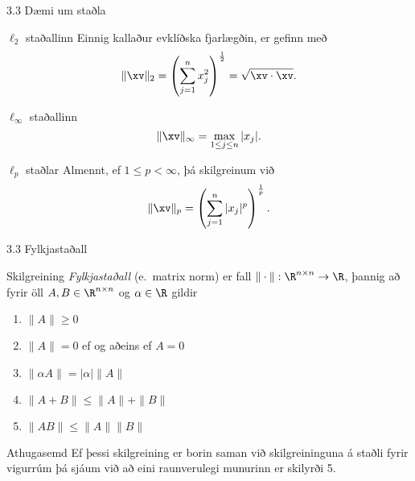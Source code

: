 \begin{frame}{3.3 Dæmi um staðla}
\begin{block}{$\ell_2$ staðallinn}
 Einnig kallaður evklíðska fjarlægðin, er gefinn með 
$$
\|\xv\|_2 = \left( \sum_{j=1}^n x_j^2 \right)^{\frac 12} = \sqrt{\xv \cdot \xv}.
$$
\end{block}
\vspace{-0.5cm}
\pause

\begin{block}{$\ell_\infty$ staðallinn}
$$
  \|\xv\|_\infty = \max_{1\leq j \leq n} |x_j|.
$$
\end{block}
\vspace{-0.5cm}
\pause

\begin{block}{$\ell_p$ staðlar}
 Almennt, ef $1\leq p < \infty$, þá skilgreinum við 
$$
\|\xv\|_p = \left( \sum_{j=1}^n |x_j|^p \right)^{\frac 1p}.
$$
\end{block}

\end{frame}

\begin{frame}{3.3 Fylkjastaðall}
 \begin{block}{Skilgreining}
  \emph{Fylkjastaðall} (e.~matrix norm) er fall $\|\cdot\|:\R^{n\times n} \to \R$,
þannig að fyrir öll $A,B \in \R^{n\times n}$ og $\alpha \in \R$ gildir\pause
\begin{enumerate}
 \item $\|A\| \geq 0$\pause
\item $\|A\| = 0$ ef og aðeins ef $A=0$\pause
\item $\| \alpha A\| = |\alpha|\|A\|$\pause
\item $\|A+B\| \leq \|A\| + \|B\|$ \pause
\item $\|AB\| \leq \|A\|\|B\|$
\end{enumerate}
 \end{block}

\begin{block}{Athugasemd}
 Ef þessi skilgreining er borin saman við skilgreininguna á staðli fyrir vigurrúm þá 
sjáum við að eini raunverulegi munurinn er skilyrði 5.
\end{block}


\end{frame}

